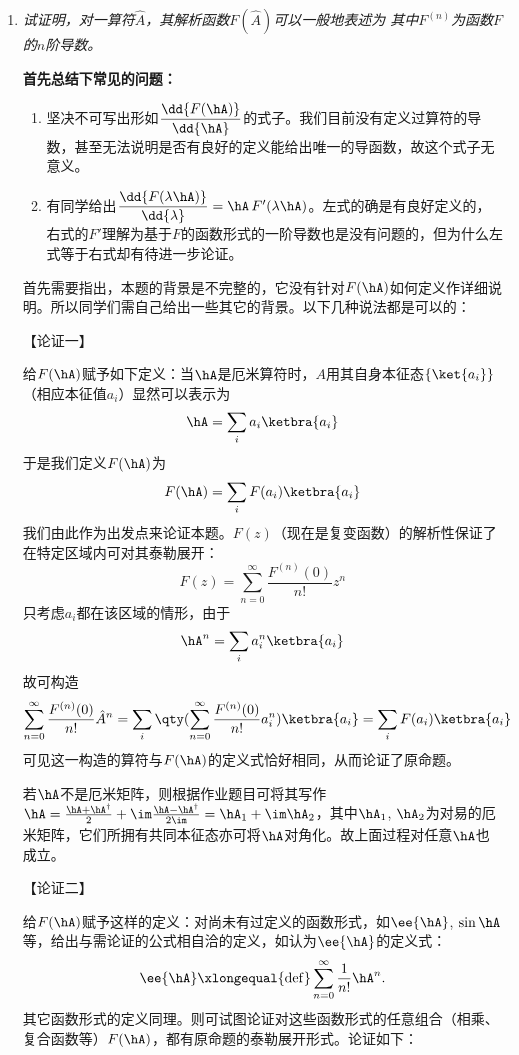 \begin{enumerate}[label=2.\Alph*]
\item
\emph{试证明，对一算符$\hat{A}$，其解析函数$F(\hat{A})$可以一般地表述为
其中$F^{(n)}$为函数$F$的$n$阶导数。}

{\color{red}\textbf{首先总结下常见的问题：}}
\begin{enumerate}
    \item 坚决不可写出形如$\dfrac{\dd{F(\hA)}}{\dd{\hA}}$的式子。我们目前没有定义过算符的导数，甚至无法说明是否有良好的定义能给出唯一的导函数，故这个式子无意义。
    \item 有同学给出$\dfrac{\dd{F(\lambda \hA)}}{\dd{\lambda}} = \hA\,F'(\lambda\hA)$。左式的确是有良好定义的，右式的$F'$理解为基于$F$的函数形式的一阶导数也是没有问题的，但为什么左式等于右式却有待进一步论证。
    
\end{enumerate}

首先需要指出，本题的背景是不完整的，它没有针对$F(\hA)$如何定义作详细说明。所以同学们需自己给出一些其它的背景。以下几种说法都是可以的：

【论证一】

给$F(\hA)$赋予如下定义：当$\hA$是厄米算符时，$A$用其自身本征态$\{\ket{a_i}\}$（相应本征值$a_i$）显然可以表示为
\[\hA = \sum_i a_i\ketbra{a_i}\]
于是我们定义$F(\hA)$为
\[F(\hA) = \sum_i F(a_i)\ketbra{a_i}\]
我们由此作为出发点来论证本题。$F(z)$（现在是复变函数）的解析性保证了在特定区域内可对其泰勒展开：
\[F(z) = \sum_{n=0}^{\infty}\frac{F^{(n)}(0)}{n!}z^n\]
只考虑${a_i}$都在该区域的情形，由于
\[\hA^n = \sum_i a_i^n\ketbra{a_i}\]
故可构造
\[\sum_{n=0}^{\infty}\frac{F^{(n)}(0)}{n!}\hat{A}^n = \sum_i \qty(\sum_{n=0}^{\infty}\frac{F^{(n)}(0)}{n!}a_i^n)\ketbra{a_i} = \sum_i F(a_i) \ketbra{a_i}\]
可见这一构造的算符与$F(\hA)$的定义式恰好相同，从而论证了原命题。

若$\hA$不是厄米矩阵，则根据作业题目可将其写作$\hA = \frac{\hA+\hA^\dagger}{2}+\im\frac{\hA-\hA^\dagger}{2\im}=\hA_1+\im \hA_2$，其中$\hA_1$, $\hA_2$为对易的厄米矩阵，它们所拥有共同本征态亦可将$\hA$对角化。故上面过程对任意$\hA$也成立。

【论证二】

给$F(\hA)$赋予这样的定义：对尚未有过定义的函数形式，如$\ee{\hA}$, $\sin\hA$等，给出与需论证的公式相自洽的定义，如认为$\ee{\hA}$的定义式：
\[\ee{\hA}  \xlongequal{\mathrm{def}} \sum_{n=0}^{\infty}\frac{1}{n!}\hA^n.\]
其它函数形式的定义同理。则可试图论证对这些函数形式的任意组合（相乘、复合函数等）$F(\hA)$，都有原命题的泰勒展开形式。论证如下：


\end{enumerate}
